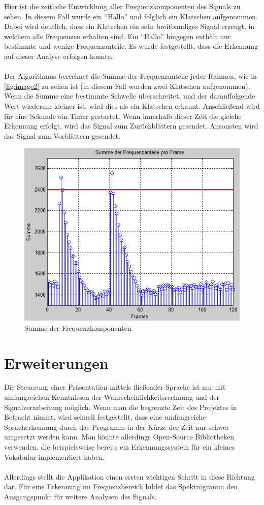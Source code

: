 Hier ist die zeitliche Entwicklung aller Frequenzkomponenten des Signals zu sehen. In diesem Fall wurde ein "`Hallo"' und folglich ein Klatschen aufgenommen. Dabei wird deutlich, dass ein Klatschen ein sehr breitbandiges Signal erzeugt, in welchem alle Frequenzen erhalten sind. Ein "`Hallo"' hingegen enthält nur bestimmte und wenige Frequenzanteile. Es wurde festgestellt, dass die Erkennung auf dieser Analyse erfolgen konnte. \\
\\
Der Algorithmus berechnet die Summe der Frequenzanteile jeder Rahmen, wie in \autoref{fig:image2} zu sehen ist (in diesem Fall wurden zwei Klatschen aufgenommen). Wenn die Summe eine bestimmte Schwelle überschreitet, und der darauffolgende Wert wiederum kleiner ist, wird dies als ein Klatschen erkannt. Anschließend wird für eine Sekunde ein Timer gestartet. Wenn innerhalb dieser Zeit die gleiche Erkennung erfolgt, wird das Signal zum Zurückblättern gesendet. Ansonsten wird das Signal zum Vorblättern gesendet.

\begin{figure}[h]
	\centering
	\includegraphics[width=1\textwidth]{BeatBilder/bild2.png}
	\caption{Summe der Frequenzkomponenten}
	\label{fig:image2}
\end{figure}

\section{Erweiterungen}
Die Steuerung einer Präsentation mittels fließender Sprache ist nur mit umfangreichen Kenntnissen der Wahrscheinlichkeitsrechnung und der Signalverarbeitung möglich. Wenn man die begrenzte Zeit des Projektes in Betracht nimmt, wird schnell festgestellt, dass  eine umfangreiche Spracherkennung durch das Programm in der Kürze der Zeit nur schwer umgesetzt werden kann. Man könnte allerdings Open-Source Bibliotheken verwenden, die beispielsweise bereits ein Erkennungssystem für ein kleines Vokabular implementiert haben.\\
\\
Allerdings stellt die Applikation einen ersten wichtigen Schritt in diese Richtung dar. Für eine Erkennung im Frequenzbereich bildet das Spektrogramm den Ausgangspunkt für weitere Analysen des Signals. 

